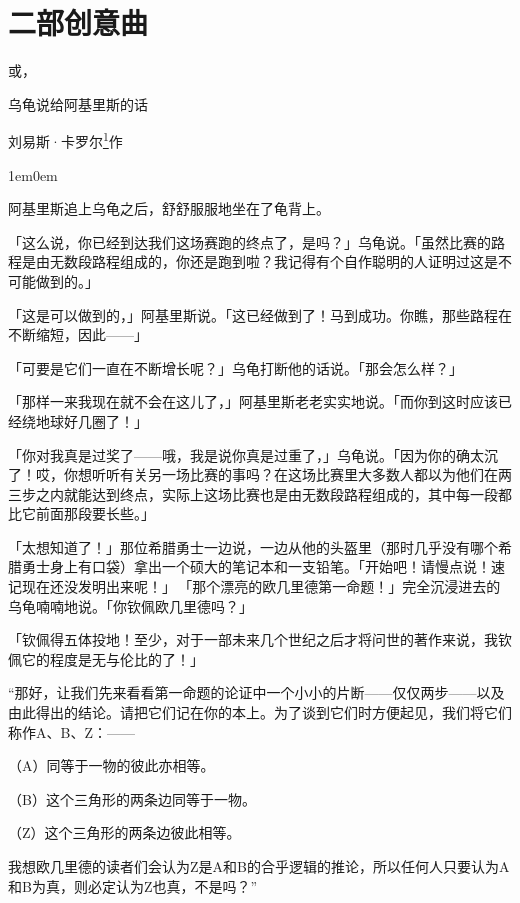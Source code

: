 \documentclass[
  12pt,
  twoside,
  openright,
  oldfontcommands,
]{memoir}
\newenvironment{dialogguide}{%
  \begin{adjustwidth}{1em}{0em}\kaitifamily\itshape\small%
}{%
  \end{adjustwidth}%
}
\begin{document}
\mainmatter
\setcounter{chapter}{1}
\markboth{}{}

\chapter*{二部创意曲}

或，

乌龟说给阿基里斯的话

刘易斯·卡罗尔{\hyperref[fn:Dialog02-1]{\textsuperscript{1}}作}

\begin{dialogguide}
阿基里斯追上乌龟之后，舒舒服服地坐在了龟背上。
\end{dialogguide}

「这么说，你已经到达我们这场赛跑的终点了，是吗？」乌龟说。「虽然比赛的路程是由无数段路程组成的，你还是跑到啦？我记得有个自作聪明的人证明过这是不可能做到的。」

「这是可以做到的，」阿基里斯说。「这已经做到了！马到成功。你瞧，那些路程在不断缩短，因此------」

「可要是它们一直在不断增长呢？」乌龟打断他的话说。「那会怎么样？」

「那样一来我现在就不会在这儿了，」阿基里斯老老实实地说。「而你到这时应该已经绕地球好几圈了！」

「你对我真是过奖了------哦，我是说你真是过重了，」乌龟说。「因为你的确太沉了！哎，你想听听有关另一场比赛的事吗？在这场比赛里大多数人都以为他们在两三步之内就能达到终点，实际上这场比赛也是由无数段路程组成的，其中每一段都比它前面那段要长些。」

「太想知道了！」那位希腊勇士一边说，一边从他的头盔里（那时几乎没有哪个希腊勇士身上有口袋）拿出一个硕大的笔记本和一支铅笔。「开始吧！请慢点说！速记现在还没发明出来呢！」\,「那个漂亮的欧几里德第一命题！」完全沉浸进去的乌龟喃喃地说。「你钦佩欧几里德吗？」

「钦佩得五体投地！至少，对于一部未来几个世纪之后才将问世的著作来说，我钦佩它的程度是无与伦比的了！」

``那好，让我们先来看看第一命题的论证中一个小小的片断------仅仅两步------以及由此得出的结论。请把它们记在你的本上。为了谈到它们时方便起见，我们将它们称作A、B、Z：------

（A）同等于一物的彼此亦相等。

（B）这个三角形的两条边同等于一物。

（Z）这个三角形的两条边彼此相等。

我想欧几里德的读者们会认为Z是A和B的合乎逻辑的推论，所以任何人只要认为A和B为真，则必定认为Z也真，不是吗？''
\end{document}
